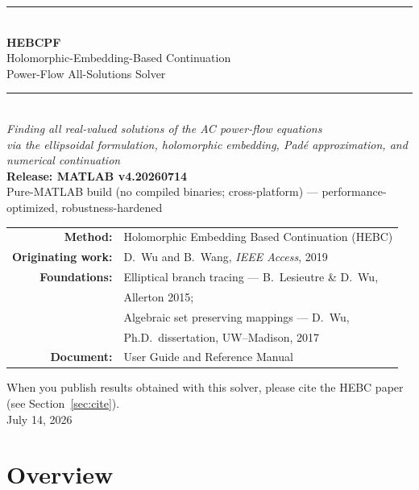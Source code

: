 \documentclass[11pt,a4paper]{article}
\begin{document}
\begin{titlepage}
\centering
\vspace*{2.2cm}
{\color{rule}\rule{\textwidth}{1.2pt}}\\[8pt]
{\Huge\bfseries HEBCPF}\\[10pt]
{\LARGE Holomorphic-Embedding-Based Continuation}\\[4pt]
{\LARGE Power-Flow All-Solutions Solver}\\[10pt]
{\color{rule}\rule{\textwidth}{1.2pt}}\\[18pt]
{\large\itshape Finding \emph{all} real-valued solutions of the AC power-flow equations}\\[6pt]
{\large\itshape via the ellipsoidal formulation, holomorphic embedding, Pad\'e approximation, and numerical continuation}\\[26pt]

{\large\bfseries Release: MATLAB v4.20260714}\\[4pt]
{\large Pure-MATLAB build (no compiled binaries; cross-platform) --- performance-optimized, robustness-hardened}\\[12pt]

\begin{tabular}{rl}
\textbf{Method:} & Holomorphic Embedding Based Continuation (HEBC)\\[3pt]
\textbf{Originating work:} & D.\ Wu and B.\ Wang, \emph{IEEE Access}, 2019\\[6pt]
\textbf{Foundations:} & Elliptical branch tracing --- B.\ Lesieutre \& D.\ Wu,\\[1pt]
                      & Allerton 2015;\\[3pt]
                      & Algebraic set preserving mappings --- D.\ Wu,\\[1pt]
                      & Ph.D.\ dissertation, UW--Madison, 2017\\[6pt]
\textbf{Document:} & User Guide and Reference Manual\\
\end{tabular}

\vfill
{\small When you publish results obtained with this solver, please cite the HEBC
paper (see Section~\ref{sec:cite}).}\\[6pt]
{\small July 14, 2026}
\end{titlepage}

\tableofcontents
\newpage

\section{Overview}
\end{document}

